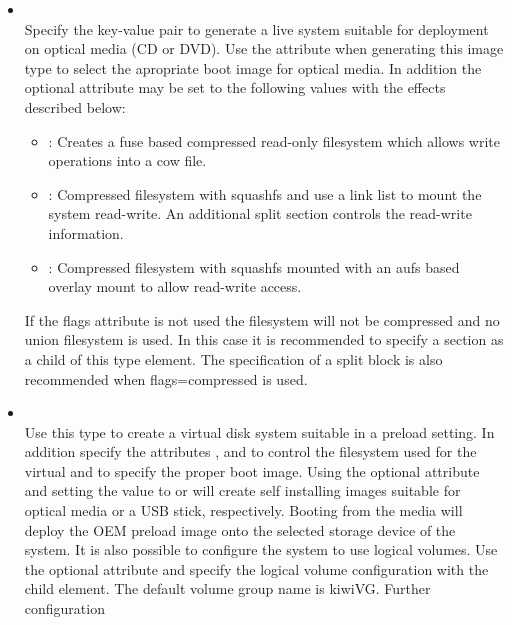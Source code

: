 \begin{itemize}
\item {}\\
      Specify the key-value pair  to generate a live system suitable
      for deployment on optical media (CD or DVD). Use the 
       attribute when generating this image
      type to select the apropriate boot image for optical media. In 
      addition the optional  attribute may be set to the
      following values with the effects described below:
      \begin{itemize}
      \item {}: Creates a fuse based compressed read-only
            filesystem which allows write operations into a cow file.
      \item {}: Compressed filesystem with squashfs and
            use a link list to mount the system read-write. An additional
            split section controls the read-write information.
      \item {}: Compressed filesystem with squashfs mounted
            with an aufs based overlay mount to allow read-write access.
      \end{itemize}
      If the flags attribute is not used the filesystem will not be compressed
      and no union filesystem is used. In this case it is recommended to
      specify a  section as a child of this type element. The
      specification of a split block is also recommended when flags=compressed
      is used.
\item {}\\
      Use this type to create a virtual disk system suitable in a preload
      setting. In addition specify the attributes , 
      and  to control the filesystem used
      for the virtual and to specify the proper boot image. Using the optional
       attribute and setting the value to  or 
       will create self installing images suitable for optical media
      or a USB stick, respectively. Booting from the media will deploy
      the OEM preload image onto the selected storage device of the
      system. It is also possible to configure the system to use logical
      volumes. Use the optional  attribute and specify the
      logical volume configuration with the  child
      element. The default volume group name is kiwiVG. Further configuration

\end{itemize}
